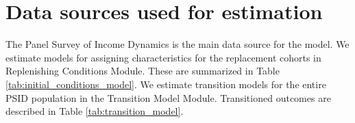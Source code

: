 \section{Data sources used for estimation}
The Panel Survey of Income Dynamics is the main data source for the model. We estimate models
for assigning characteristics for the replacement cohorts in Replenishing Conditions Module.  These
are summarized in Table \ref{tab:initial_conditions_model}.  We estimate transition models for 
the entire PSID population in the Transition Model Module.  Transitioned outcomes are described in
Table \ref{tab:transition_model}.




%
%


